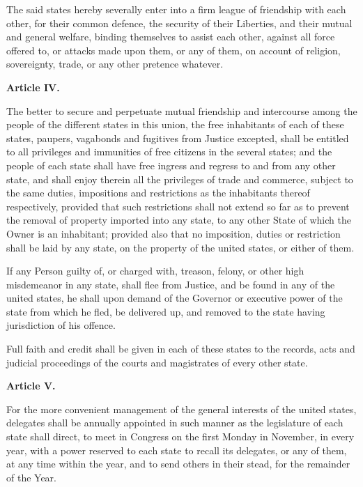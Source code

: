 The said states hereby severally enter into a firm league of friendship with each other, for their common defence, the security of their Liberties, and their mutual and general welfare, binding themselves to assist each other, against all force offered to, or attacks made upon them, or any of them, on account of religion, sovereignty, trade, or any other pretence whatever.

\begin{center}
\textbf{Article IV.}  
\end{center}

The better to secure and perpetuate mutual friendship and intercourse among the people of the different states in this union, the free inhabitants of each of these states, paupers, vagabonds and fugitives from Justice excepted, shall be entitled to all privileges and immunities of free citizens in the several states; and the people of each state shall have free ingress and regress to and from any other state, and shall enjoy therein all the privileges of trade and commerce, subject to the same duties, impositions and restrictions as the inhabitants thereof respectively, provided that such restrictions shall not extend so far as to prevent the removal of property imported into any state, to any other State of which the Owner is an inhabitant; provided also that no imposition, duties or restriction shall be laid by any state, on the property of the united states, or either of them.

If any Person guilty of, or charged with, treason, felony, or other high misdemeanor in any state, shall flee from Justice, and be found in any of the united states, he shall upon demand of the Governor or executive power of the state from which he fled, be delivered up, and removed to the state having jurisdiction of his offence.

Full faith and credit shall be given in each of these states to the records, acts and judicial proceedings of the courts and magistrates of every other state.

\begin{center}
\textbf{Article V.}  
\end{center}

For the more convenient management of the general interests of the united states, delegates shall be annually appointed in such manner as the legislature of each state shall direct, to meet in Congress on the first Monday in November, in every year, with a power reserved to each state to recall its delegates, or any of them, at any time within the year, and to send others in their stead, for the remainder of the Year.

